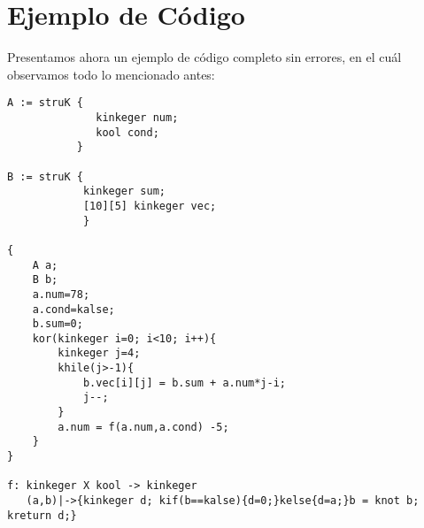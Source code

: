 \documentclass[a4paper, 11pt, twoside, openany, onecolumn, final]{memoir}
\begin{document}
	 \section{Ejemplo de Código}
	 Presentamos ahora un ejemplo de código completo sin errores, en el cuál observamos todo lo mencionado antes:
\begin{verbatim}
A := struK {
              kinkeger num;
              kool cond;
           }
           
B := struK {
            kinkeger sum;
            [10][5] kinkeger vec;
            }
			
{
    A a;
    B b;
    a.num=78;
    a.cond=kalse;
    b.sum=0;
    kor(kinkeger i=0; i<10; i++){
        kinkeger j=4;
        khile(j>-1){
            b.vec[i][j] = b.sum + a.num*j-i;
            j--;
        }
        a.num = f(a.num,a.cond) -5;	
    }
}

f: kinkeger X kool -> kinkeger
   (a,b)|->{kinkeger d; kif(b==kalse){d=0;}kelse{d=a;}b = knot b; kreturn d;}  
\end{verbatim}
	
\end{document}
